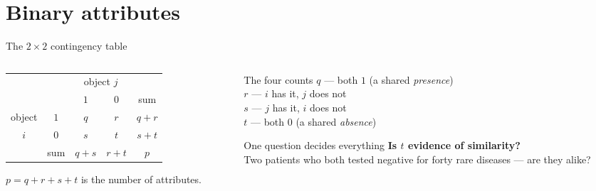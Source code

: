 \documentclass[aspectratio=169]{beamer}
\begin{document}
\section[Binary]{Binary attributes}
\label{sec:bin}

\begin{frame}{The $2 \times 2$ contingency table}
  \begin{columns}[T]
    \begin{column}{0.46\textwidth}
      \begin{center}
        \begin{tabular}{cc|cc|c}
          & & \multicolumn{2}{c|}{object $j$} & \\
          & & $1$ & $0$ & sum \\ \hline
          object & $1$ & $q$ & $r$ & $q+r$ \\
          $i$    & $0$ & $s$ & $t$ & $s+t$ \\ \hline
                 & sum & $q+s$ & $r+t$ & $p$
        \end{tabular}
      \end{center}
      \vspace{0.3em}
      \small $p = q+r+s+t$ is the number of attributes.
    \end{column}
    \begin{column}{0.5\textwidth}
      \begin{block}{The four counts}
        $q$ --- both $1$ (a shared \emph{presence})\\
        $r$ --- $i$ has it, $j$ does not\\
        $s$ --- $j$ has it, $i$ does not\\
        $t$ --- both $0$ (a shared \emph{absence})
      \end{block}
      \begin{alertblock}{One question decides everything}
        \textbf{Is $t$ evidence of similarity?}\\
        Two patients who both tested negative for forty rare diseases ---
        are they alike?
      \end{alertblock}
    \end{column}
  \end{columns}
\end{frame}
\end{document}
